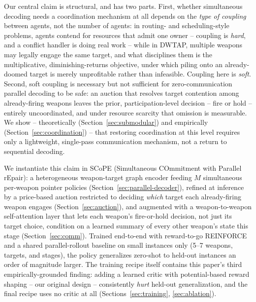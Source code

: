 Our central claim is structural, and has two parts. First, whether simultaneous decoding needs a coordination mechanism at all depends on the \emph{type of coupling} between agents, not the number of agents: in routing- and scheduling-style problems, agents contend for resources that admit one owner -- coupling is \emph{hard}, and a conflict handler is doing real work -- while in DWTAP, multiple weapons may legally engage the same target, and what disciplines them is the multiplicative, diminishing-returns objective, under which piling onto an already-doomed target is merely unprofitable rather than infeasible. Coupling here is \emph{soft}. Second, soft coupling is necessary but not sufficient for zero-communication parallel decoding to be safe: an auction that resolves target contention among already-firing weapons leaves the prior, participation-level decision -- fire or hold -- entirely uncoordinated, and under resource scarcity that omission is measurable. We show -- theoretically (Section~\ref{sec:submodular}) and empirically (Section~\ref{sec:coordination}) -- that restoring coordination at this level requires only a lightweight, single-pass communication mechanism, not a return to sequential decoding.

We instantiate this claim in SCoPE (Simultaneous COmmitment with Parallel rEpair): a heterogeneous weapon-target graph encoder feeding $M$ simultaneous per-weapon pointer policies (Section~\ref{sec:parallel-decoder}), refined at inference by a price-based auction restricted to deciding \emph{which} target each already-firing weapon engages (Section~\ref{sec:auction}), and augmented with a weapon-to-weapon self-attention layer that lets each weapon's fire-or-hold decision, not just its target choice, condition on a learned summary of every other weapon's state this stage (Section~\ref{sec:comm}). Trained end-to-end with reward-to-go REINFORCE and a shared parallel-rollout baseline on small instances only (5--7 weapons, targets, and stages), the policy generalizes zero-shot to held-out instances an order of magnitude larger. The training recipe itself contains this paper's third empirically-grounded finding: adding a learned critic with potential-based reward shaping -- our original design -- consistently \emph{hurt} held-out generalization, and the final recipe uses no critic at all (Sections~\ref{sec:training}, \ref{sec:ablation}).

